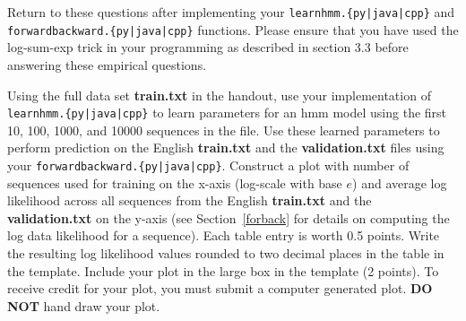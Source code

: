 \documentclass[11pt,addpoints,answers]{exam}
\begin{document}
\begin{questions}

\clearpage

\question[6] Return to these questions after implementing your \texttt{learnhmm.\{py|java|cpp\}} and \\ \texttt{forwardbackward.\{py|java|cpp\}} functions. Please ensure that you have used the log-sum-exp trick in your programming as described in section 3.3 before answering these empirical questions.

Using the full data set \textbf{train.txt} in the handout, use your implementation of\\ \texttt{learnhmm.\{py|java|cpp\}} to learn parameters for an hmm model using the first 10, 100, 1000, and 10000 sequences in the file.
Use these learned parameters to perform prediction on the English \textbf{train.txt} and the \textbf{validation.txt} files using your \texttt{forwardbackward.\{py|java|cpp\}}.
Construct a plot with number of sequences used for training on the x-axis (log-scale with base $e$) and average log likelihood across all sequences from the English \textbf{train.txt} and the \textbf{validation.txt} on the y-axis (see Section~\ref{forback} for details on computing the log data likelihood for a sequence). Each table entry is worth 0.5 points. 
Write the resulting log likelihood values rounded to two decimal places in the table in the template.
Include your plot in the large box in the template (2 points).
To receive credit for your plot, you must submit a computer generated plot.
\textbf{DO NOT} hand draw your plot.


\end{questions}
\end{document}
